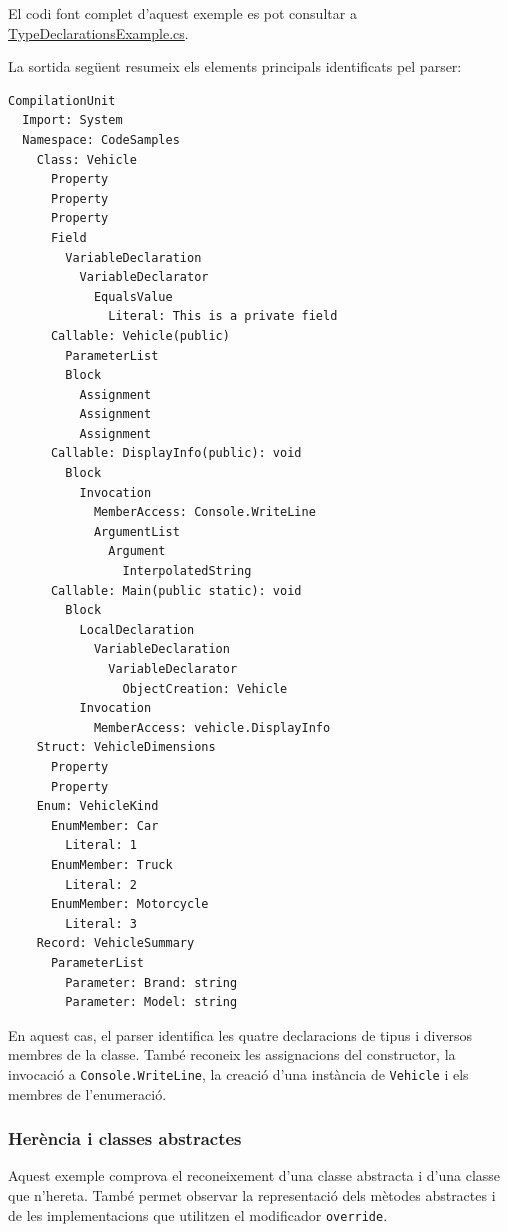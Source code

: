 El codi font complet d'aquest exemple es pot consultar
a \href{https://github.com/PauDiazM/static-code-analysis-tfg/blob/main/code_samples/examples/TypeDeclarationsExample.cs}{TypeDeclarationsExample.cs}.

La sortida següent resumeix els elements principals identificats pel parser:

\begin{lstlisting}[style=output,
    caption={Sortida resumida del mòdul Parser per a les declaracions de tipus},
    label={lst:type-declarations-output}]
CompilationUnit
  Import: System
  Namespace: CodeSamples
    Class: Vehicle
      Property
      Property
      Property
      Field
        VariableDeclaration
          VariableDeclarator
            EqualsValue
              Literal: This is a private field
      Callable: Vehicle(public)
        ParameterList
        Block
          Assignment
          Assignment
          Assignment
      Callable: DisplayInfo(public): void
        Block
          Invocation
            MemberAccess: Console.WriteLine
            ArgumentList
              Argument
                InterpolatedString
      Callable: Main(public static): void
        Block
          LocalDeclaration
            VariableDeclaration
              VariableDeclarator
                ObjectCreation: Vehicle
          Invocation
            MemberAccess: vehicle.DisplayInfo
    Struct: VehicleDimensions
      Property
      Property
    Enum: VehicleKind
      EnumMember: Car
        Literal: 1
      EnumMember: Truck
        Literal: 2
      EnumMember: Motorcycle
        Literal: 3
    Record: VehicleSummary
      ParameterList
        Parameter: Brand: string
        Parameter: Model: string
\end{lstlisting}

En aquest cas, el parser identifica les quatre declaracions de tipus i diversos
membres de la classe. També reconeix les assignacions del constructor, la invocació
a \texttt{Console.WriteLine}, la creació d'una instància de \texttt{Vehicle} i els
membres de l'enumeració.

\subsubsection*{Herència i classes abstractes}
\label{sec:parser-inheritance}

Aquest exemple comprova el reconeixement d'una classe abstracta i d'una classe que
n'hereta. També permet observar la representació dels mètodes abstractes i de les
implementacions que utilitzen el modificador \texttt{override}.

